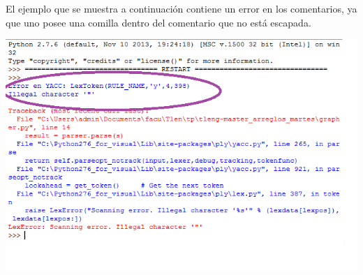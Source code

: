 El ejemplo que se muestra a continuaci\'on contiene un error en los comentarios, ya que uno posee una comilla dentro del comentario que no est\'a escapada.\\



\centerline{\includegraphics[scale=0.70]{../imagenes/carainvalid.png}}